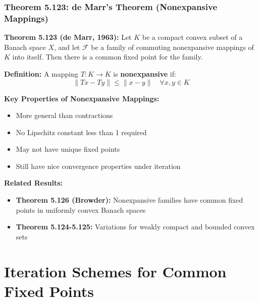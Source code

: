 \documentclass[aspectratio=169,10pt]{beamer}
\begin{document}
\begin{frame}
\frametitle{Theorem 5.123: de Marr's Theorem (Nonexpansive Mappings)}

\textbf{Theorem 5.123 (de Marr, 1963):} Let $K$ be a compact convex subset of a Banach space $X$,
and let $\mathcal{F}$ be a family of commuting nonexpansive mappings of $K$ into itself.
Then there is a common fixed point for the family.

\vspace{0.3cm}

\textbf{Definition:} A mapping $T: K \to K$ is \textbf{nonexpansive} if:
$$\|Tx - Ty\| \leq \|x - y\| \quad \forall x, y \in K$$

\vspace{0.3cm}

\textbf{Key Properties of Nonexpansive Mappings:}
\begin{itemize}
    \item More general than contractions
    \item No Lipschitz constant less than 1 required
    \item May not have unique fixed points
    \item Still have nice convergence properties under iteration
\end{itemize}

\vspace{0.3cm}

\textbf{Related Results:}
\begin{itemize}
    \item \textbf{Theorem 5.126 (Browder):} Nonexpansive families have common fixed points in uniformly convex Banach spaces
    \item \textbf{Theorem 5.124-5.125:} Variations for weakly compact and bounded convex sets
\end{itemize}

\end{frame}

\section{Iteration Schemes for Common Fixed Points}
\end{document}
